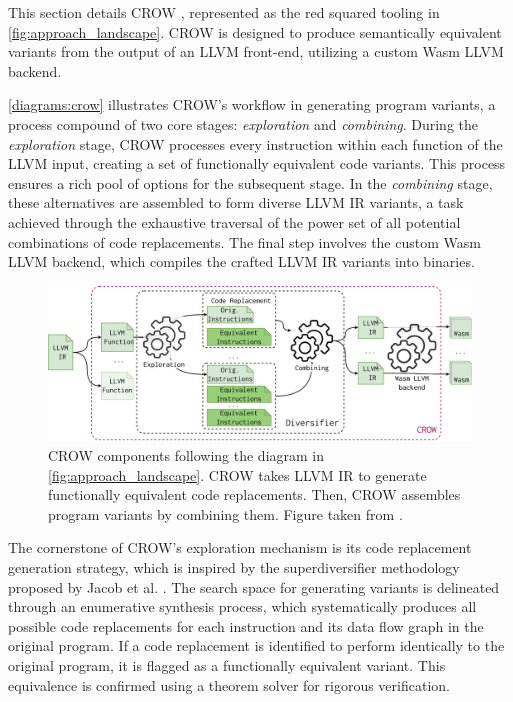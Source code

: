 
\label{section:crow}
\renewcommand{\tool}{CROW\xspace}

This section details CROW \cite{CROW}, represented as the red squared tooling in \autoref{fig:approach_landscape}. 
CROW is designed to produce semantically equivalent \wasm variants from the output of an LLVM front-end, utilizing a custom Wasm LLVM backend.

\autoref{diagrams:crow} illustrates CROW's workflow in generating program variants, a process compound of two core stages: \textit{exploration} and \textit{combining}. 
During the \textit{exploration} stage, CROW processes every instruction within each function of the LLVM input, creating a set of functionally equivalent code variants. 
This process ensures a rich pool of options for the subsequent stage.
In the \textit{combining} stage, these alternatives are assembled to form diverse LLVM IR variants, a task achieved through the exhaustive traversal of the power set of all potential combinations of code replacements. 
The final step involves the custom Wasm LLVM backend, which compiles the crafted LLVM IR variants into \wasm binaries. 


\begin{figure}[h]
    \includegraphics[width=\linewidth]{diagrams/generation/crow.drawio.pdf}
    \caption{CROW components following the diagram in \autoref{fig:approach_landscape}. CROW takes LLVM IR to generate functionally equivalent code replacements. Then, CROW assembles program variants by combining them. Figure taken from \cite{Lic}.}
    \label{diagrams:crow}
\end{figure}



The cornerstone of CROW's exploration mechanism is its code replacement generation strategy, which is inspired by the superdiversifier methodology proposed by Jacob et al. \cite{jacob2008superdiversifier}. 
The search space for generating variants is delineated through an enumerative synthesis process, which systematically produces all possible code replacements for each instruction and its data flow graph in the original program. 
If a code replacement is identified to perform identically to the original program, it is flagged as a functionally equivalent variant.
This equivalence is confirmed using a theorem solver for rigorous verification.

